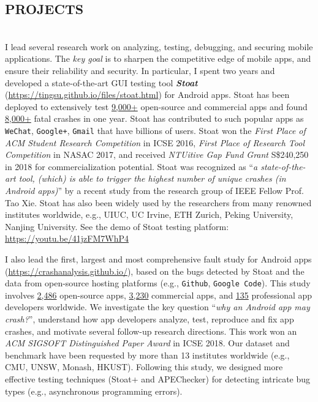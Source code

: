 \documentclass[margin]{res}
\begin{document}
\begin{resume}
\section{PROJECTS}
\\
I lead several research work on analyzing, testing, debugging, and securing mobile applications. The \emph{key goal} is to sharpen the competitive edge of mobile apps, and ensure their reliability and security.
In particular, I spent two years and developed a state-of-the-art GUI testing tool \emph{\textbf{Stoat}} (\url{https://tingsu.github.io/files/stoat.html}) for Android apps.
Stoat has been deployed to extensively test \underline{9,000+} open-source and commercial apps and found \underline{8,000+} fatal crashes in one year. Stoat has contributed to such popular apps as \texttt{WeChat}, \texttt{Google+}, \texttt{Gmail} that have billions of users. Stoat won the \emph{First Place of ACM Student Research Competition} in ICSE 2016, \emph{First Place of Research Tool Competition} in NASAC 2017, and received \emph{NTUitive Gap Fund Grant} S\$240,250 in 2018 for commercialization potential. Stoat was recognized as ``\emph{a state-of-the-art tool, (which) is able to trigger the highest number of unique crashes (in Android apps)}'' by a recent study from the research group of IEEE Fellow Prof. Tao Xie. Stoat has also been widely used by the researchers from many renowned institutes worldwide, e.g., UIUC, UC Irvine, ETH Zurich, Peking University, Nanjing University. See the demo of Stoat testing platform: \url{https://youtu.be/41jzFM7WhP4}

I also lead the first, largest and most comprehensive fault study for Android apps (\url{https://crashanalysis.github.io/}), based on the bugs detected by Stoat and the data from open-source hosting platforms (e.g., \texttt{Github}, \texttt{Google Code}). This study involves \underline{2,486} open-source apps, \underline{3,230} commercial apps, and \underline{135} professional app developers worldwide. We investigate the key question ``\emph{why an Android app may crash?}'', understand how app developers analyze, test, reproduce and fix app crashes, and motivate several follow-up research directions. This work won an \emph{ACM SIGSOFT Distinguished Paper Award} in ICSE 2018. Our dataset and benchmark have been requested by more than 13 institutes worldwide (e.g., CMU, UNSW, Monash, HKUST). Following this study, we designed more effective testing techniques (Stoat+ and APEChecker) for detecting intricate bug types (e.g., asynchronous programming errors).


\end{resume}
\end{document}
